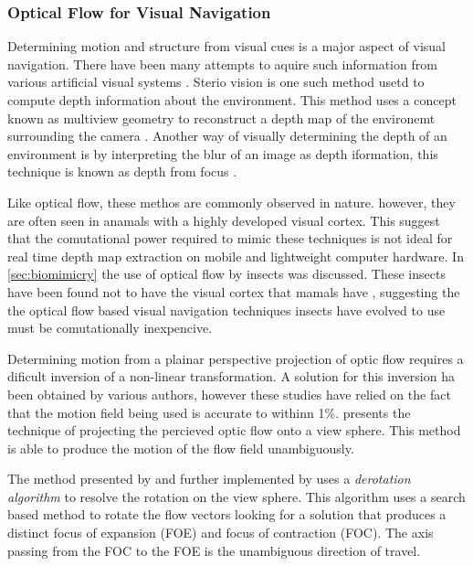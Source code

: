 \documentclass{UoNMCHA}
\numberwithin{equation}{section}
\begin{document}
\subsubsection{Optical Flow for Visual Navigation}\label{sec:OpticalFlowforVisualNavigation}

Determining motion and structure from visual cues is a major aspect of visual navigation. There have been many attempts to aquire such information from various artificial visual systems \citep{nelson1988finding}. Sterio vision is one such method usetd to compute depth information about the environment. This method uses a concept known as multiview geometry to reconstruct a depth map of the environemt surrounding the camera \citep{learningOpenCV}. Another way of visually determining the depth of an environment is by interpreting the blur of an image as depth iformation, this technique is known as depth from focus \citep{grossmann1987depth}.

Like optical flow, these methos are commonly observed in nature. however, they are often seen in anamals with a highly developed visual cortex. This suggest that the comutational power required to mimic these techniques is not ideal for real time depth map extraction on mobile and lightweight computer hardware. In \cref{sec:biomimicry} the use of optical flow by insects was discussed. These insects have been found not to have the visual cortex that mamals have \citep{srinivasan2012biology}, suggesting the the optical flow based visual navigation techniques insects have evolved to use must be comutationally inexpencive.

Determining motion from a plainar perspective projection of optic flow requires a dificult inversion of a non-linear transformation. A solution for this inversion ha been obtained by various authors, however these studies have relied on the fact that the motion field being used is accurate to withinn 1\%. \cite{nelson1988finding} presents the technique of projecting the percieved optic flow onto a view sphere. This method is able to produce the motion of the flow field unambiguously.

The method presented by \cite{nelson1988finding} and further implemented by \cite{4209850} uses a \textit{derotation algorithm} to resolve the rotation on the view sphere. This algorithm uses a search based method to rotate the flow vectors looking for a solution that produces a distinct focus of expansion (FOE) and focus of contraction (FOC). The axis passing from the FOC to the FOE is the unambiguous direction of travel.
\end{document}
